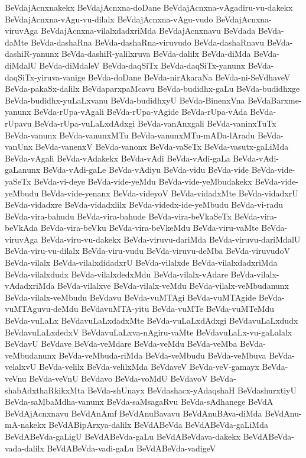 {BeVdajAcnxnakekx
BeVdajAcnxna-doDane
BeVdajAcnxna-vAgadiru-vu-dakekx
BeVdajAcnxna-vAgu-vu-dilalx
BeVdajAcnxna-vAgu-vudo
BeVdajAcnxna-viruvAga
BeVdajAcnxna-vilalxdadxriMda
BeVdajAcnxnavu
BeVdada
BeVda-daMte
BeVda-dashaRna
BeVda-dashaRna-viruvudo
BeVda-dashaRnavu
BeVda-dashiR-yanunx
BeVda-dashiR-yalilxruva
BeVda-dalilx
BeVda-diMda
BeVda-diMdalU
BeVda-diMdaleV
BeVda-daqSiTx
BeVda-daqSiTx-yanunx
BeVda-daqSiTx-yiruva-vanige
BeVda-doDane
BeVda-nirAkaraNa
BeVda-ni-SeVdhaveV
BeVda-pakaSx-dalilx
BeVdaparxpaMcavu
BeVda-budidhx-gaLu
BeVda-budidhxge
BeVda-budidhx-yuLaLxvanu
BeVda-budidhxyU
BeVda-BinenxVna
BeVdaBarxme-yanunx
BeVda-rUpa-vAgali
BeVda-rUpa-vAgide
BeVda-rUpa-vAda
BeVda-rUpavu
BeVda-rUpa-vuLaLxdAdxgi
BeVda-vanAnxgali
BeVda-vaninxTuTx
BeVda-vanunx
BeVda-vanunxMTu
BeVda-vanunxMTu-mADa-lAradu
BeVda-vanUnx
BeVda-vanenxV
BeVda-vanonx
BeVda-vaSeTx
BeVda-vasutx-gaLiMda
BeVda-vAgali
BeVda-vAdakekx
BeVda-vAdi
BeVda-vAdi-gaLa
BeVda-vAdi-gaLanunx
BeVda-vAdi-gaLe
BeVda-vAdiyu
BeVda-vidu
BeVda-vide
BeVda-vide-yaSeTx
BeVda-vi-deye
BeVda-vide-yeMdu
BeVda-vide-yeMbudakekx
BeVda-vide-yeMbudu
BeVda-vide-yenanx
BeVda-videyoV
BeVda-vidadxMte
BeVda-vidadxrU
BeVda-vidadxre
BeVda-vidadxlilx
BeVda-videdx-ide-yeMbudu
BeVda-vi-radu
BeVda-vira-bahudu
BeVda-vira-bahude
BeVda-vira-beVkaSeTx
BeVda-vira-beVkAda
BeVda-vira-beVku
BeVda-vira-beVkeMdu
BeVda-viru-vaMte
BeVda-viruvAga
BeVda-viru-vu-dakekx
BeVda-viruvu-dariMda
BeVda-viruvu-dariMdalU
BeVda-viru-vu-dilalx
BeVda-viru-vudu
BeVda-viruvu-deMba
BeVda-viruvudoV
BeVda-vilalx
BeVda-vilalxdidadxrU
BeVda-vilalxde
BeVda-vilalxdadxriMda
BeVda-vilalxdudx
BeVda-vilalxdedxMdu
BeVda-vilalx-vAdare
BeVda-vilalx-vAdadxriMda
BeVda-vilalxve
BeVda-vilalx-veMdu
BeVda-vilalx-veMbudanunx
BeVda-vilalx-veMbudu
BeVdavu
BeVda-vuMTAgi
BeVda-vuMTAgide
BeVda-vuMTAguvu-deMdu
BeVdavuMTA-yitu
BeVda-vuMTe
BeVda-vuMTeMdu
BeVda-vuLaLx
BeVdavuLaLxdadxMte
BeVda-vuLaLxdAdxgi
BeVdavuLaLxdudx
BeVdavuLaLxdedxV
BeVdavuLaLxva-nAgiru-vaMte
BeVdavuLaLx-vu-gaLalalx
BeVdavU
BeVdave
BeVda-veMdare
BeVda-veMdu
BeVda-veMba
BeVda-veMbudanunx
BeVda-veMbuda-riMda
BeVda-veMbudu
BeVda-veMbuva
BeVda-velalxvU
BeVda-velilx
BeVda-velilxMda
BeVdaveV
BeVda-veV-gamayx
BeVda-veVnu
BeVda-veVnU
BeVdavo
BeVda-voMdU
BeVdavoV
BeVda-shabAdxthaRkikxMta
BeVda-shUnayx
BeVdashacx-yAdaqshaH
BeVdashurxtiyU
BeVda-saMbaMdha-vanunx
BeVda-saMsagaRvu
BeVda-sAdhanege
BeVdA
BeVdAjAcnxnavu
BeVdAnAmf
BeVdAnuBavavu
BeVdAnuBAva-diMda
BeVdAnu-mA-nakekx
BeVdABipArxya-dalilx
BeVdABeVda
BeVdABeVda-gaLiMda
BeVdABeVda-gaLigU
BeVdABeVda-gaLu
BeVdABeVdava-dakekx
BeVdABeVda-vada-dalilx
BeVdABeVda-vadi-gaLu
BeVdABeVda-vadigeV
}
